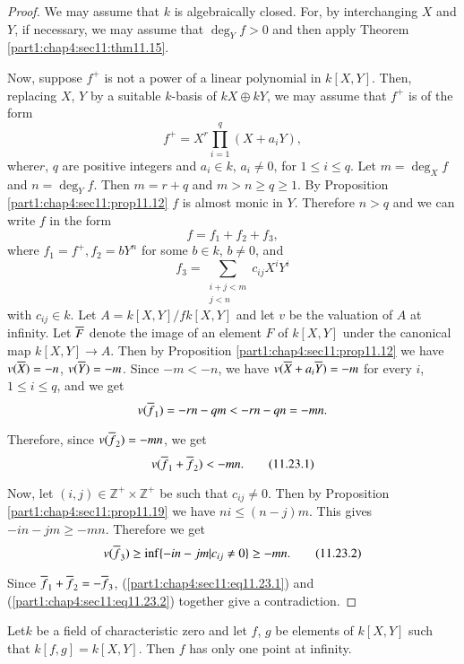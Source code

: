 \begin{proof}
We may assume that $k$ is algebraically closed. For, by interchanging $X$ and $Y$, if necessary, we may assume that $\deg_Y f>0$ and then apply Theorem \ref{part1:chap4:sec11:thm11.15}.

Now, suppose $f^+$ is not a power of a linear polynomial in $k[X,Y]$. Then, replacing $X$, $Y$ by a suitable $k$-basis of $kX \oplus k Y$, we may assume that $f^+$ is of the form
  $$
  f^+ = X^r \prod^q_{i=1} (X+ a_i Y),
  $$
  where\pageoriginale $r$, $q$ are positive integers and $a_i \in k$,
  $a_i \neq 0$, for $1 \leq i \leq q$. Let $m= \deg_Xf$ and $n =\deg_Y f$. Then $m= r+q$
  and $m> n \geq q \geq 1$. By Proposition
  \ref{part1:chap4:sec11:prop11.12} $f$ is almost monic in
  $Y$. Therefore  $n > q$ and we can write $f$ in the form
  $$
  f= f_1 + f_2 + f_3,
  $$
  where $f_1 = f^+ , f_2= b Y^n$ for some $b \in k$, $b \neq 0$, and 
$$
f_3 = \sum_{\substack{i+j < m\\j< n}} c_{ij} X^i Y^i
$$
with $c_{ij} \in k$. Let $A=k[X, Y]/fk[X, Y]$ and let $v$ be the
valuation of $A$ at infinity. Let $\overline{F}$ denote the image of an
element $F$ of $k[X, Y]$ under the canonical map $k[X, Y]\to A$. Then
by Proposition \ref{part1:chap4:sec11:prop11.12} we have $v(\overline{X})=-
n$, $v (\overline{Y})=- m$. Since $-m < -n$, we have $v (\overline{X}+ a_i
\overline{Y})=-m$ for every $i$, $1 \leq i \leq q$, and we get
$$
v(\overline{f}_1)= -rn - qm < -rn -qn=-mn.
$$

Therefore, since $v(\overline{f}_2)=- mn$, we get
\begin{equation*}
  v(\overline{f}_1 + \overline{f}_2) <
  -mn. \tag{11.23.1}\label{part1:chap4:sec11:eq11.23.1} 
\end{equation*}

Now, let $(i, j) \in \mathbb{Z}^+ \times \mathbb{Z}^+$ be such that
$c_{ij} \neq 0$. Then by Proposition \ref{part1:chap4:sec11:prop11.19}
we have $ni \leq (n-j)m$. This gives $-in -jm \geq -mn$. Therefore we
get
\begin{equation*}
v(\overline{f}_3) \geq \inf \{ -in -jm | c_{ij} \neq 0\} \geq -
mn.\tag{11.23.2}\label{part1:chap4:sec11:eq11.23.2}  
\end{equation*}

Since  $\overline{f}_1 + \overline{f}_2= -
\overline{f}_3$, (\ref{part1:chap4:sec11:eq11.23.1})
and (\ref{part1:chap4:sec11:eq11.23.2}) together give a contradiction.
\end{proof}

\setcounter{thm}{23}
\begin{coro}\label{part1:chap4:sec11:coro11.24}
  Let\pageoriginale $k$ be a field of characteristic zero and let $f$, $g$ be
  elements of $k[X, Y]$ such that $k[f, g]= k[X, Y]$. Then $f$ has
  only one point at infinity.
\end{coro}

